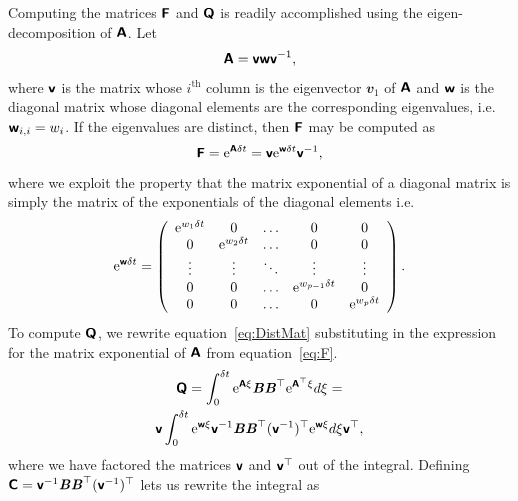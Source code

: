 \documentclass[a4paper,fleqn,usenatbib]{mnras}
\begin{document}
Computing the matrices $\textbf{\textsf{F}}$ and $\textbf{\textsf{Q}}$ is readily accomplished using the eigen-decomposition of $\textbf{\textsf{A}}$. Let
\begin{equation}
\textbf{\textsf{A}} = \textbf{\textsf{v}}\textbf{\textsf{w}}\textbf{\textsf{v}}^{-1},
\end{equation}
where $\textbf{\textsf{v}}$ is the matrix whose $i^{\mathrm{th}}$ column is the eigenvector $\mathbfit{v}_{1}$ of $\textbf{\textsf{A}}$ and $\textbf{\textsf{w}}$ is the diagonal matrix whose diagonal elements are the corresponding eigenvalues, i.e. $\textbf{\textsf{w}}_{i,i} = w_{i}$. If the eigenvalues are distinct, then $\textbf{\textsf{F}}$ may be computed as
\begin{equation}\label{eq:F}
\textbf{\textsf{F}} = \mathrm{e}^{\textbf{\textsf{A}}\delta t} = \textbf{\textsf{v}}\mathrm{e}^{\textbf{\textsf{w}}\delta t}\textbf{\textsf{v}}^{-1},
\end{equation}
where we exploit the property that the matrix exponential of a diagonal matrix is simply the matrix of the exponentials of the diagonal elements i.e.
\begin{equation}\label{eq:MatrixExp}
\mathrm{e}^{\textbf{\textsf{w}}\delta t} = \left( \begin{array}{ccccc} 
\mathrm{e}^{w_{1} \delta t} & 0 & \hdots & 0 & 0 \\
0 & \mathrm{e}^{w_{2} \delta t} & \hdots & 0 & 0 \\
\vdots & \vdots & \ddots & \vdots & \vdots \\
0 & 0 & \hdots & \mathrm{e}^{w_{p-1} \delta t} & 0 \\
0 & 0 & \hdots & 0 & \mathrm{e}^{w_{p} \delta t} \\
\end{array}\right).
\end{equation}
To compute $\textbf{\textsf{Q}}$, we rewrite equation~\ref{eq:DistMat} substituting in the expression for the matrix exponential of $\textbf{\textsf{A}}$ from equation~\ref{eq:F}.
\begin{multline}\label{eq:DistMat2}
\textbf{\textsf{Q}} = \int_{0}^{\delta t} \mathrm{e}^{\textbf{\textsf{A}}\xi}\textbf{\textit{B}}\textbf{\textit{B}}^{\top}\mathrm{e}^{\textbf{\textsf{A}}^{\top}\xi} d\xi = \\ \textbf{\textsf{v}} \int_{0}^{\delta t} \mathrm{e}^{\textbf{\textsf{w}}\xi}\textbf{\textsf{v}}^{-1}\textbf{\textit{B}}\textbf{\textit{B}}^{\top}(\textbf{\textsf{v}}^{-1})^{\top} \mathrm{e}^{\textbf{\textsf{w}}\xi} d\xi \textbf{\textsf{v}}^{\top},
\end{multline}
where we have factored the matrices $\textbf{\textsf{v}}$ and $\textbf{\textsf{v}}^{\top}$ out of the integral. Defining $\textbf{\textsf{C}} = \textbf{\textsf{v}}^{-1}\textbf{\textit{B}}\textbf{\textit{B}}^{\top}(\textbf{\textsf{v}}^{-1})^{\top}$ lets us rewrite the integral as
\end{document}
